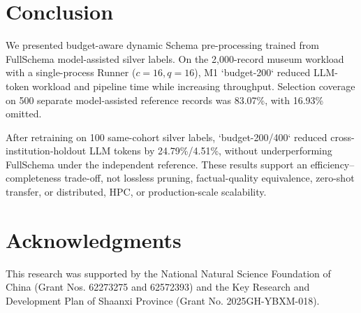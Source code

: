 \documentclass[runningheads]{llncs}
\begin{document}
\section{Conclusion}

We presented budget-aware dynamic Schema pre-processing trained from
FullSchema model-assisted silver labels. On the 2,000-record museum
workload with a single-process Runner ($c=16,q=16$), M1 `budget-200`
reduced LLM-token workload and pipeline time while increasing
throughput. Selection coverage on 500 separate model-assisted reference
records was 83.07\%, with 16.93\% omitted.

After retraining on 100 same-cohort silver labels, `budget-200/400`
reduced cross-institution-holdout LLM tokens by 24.79\%/4.51\%,
without underperforming FullSchema under the independent reference.
These results support an efficiency--completeness trade-off, not
lossless pruning, factual-quality equivalence, zero-shot transfer,
or distributed, HPC, or production-scale scalability.

\section{Acknowledgments}
This research was supported by the National Natural Science
Foundation of China (Grant Nos. 62273275 and 62572393) and
the Key Research and Development Plan of Shaanxi Province
(Grant No. 2025GH-YBXM-018).



\end{document}
